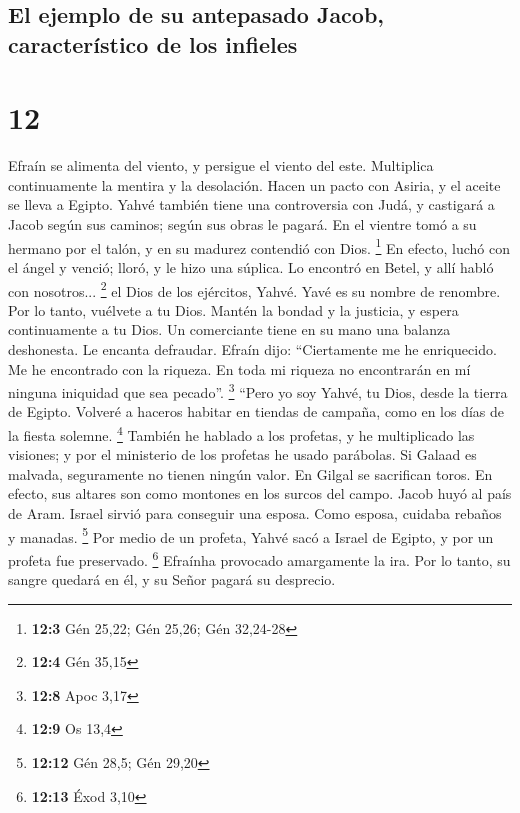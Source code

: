 \hypertarget{el-ejemplo-de-su-antepasado-jacob-caracteruxedstico-de-los-infieles}{%
\subsection{El ejemplo de su antepasado Jacob, característico de los
infieles}\label{el-ejemplo-de-su-antepasado-jacob-caracteruxedstico-de-los-infieles}}

\hypertarget{section-11}{%
\section{12}\label{section-11}}

 Efraín se alimenta del viento, y persigue el viento del
este. Multiplica continuamente la mentira y la desolación. Hacen un
pacto con Asiria, y el aceite se lleva a Egipto.  Yahvé
también tiene una controversia con Judá, y castigará a Jacob según sus
caminos; según sus obras le pagará.  En el vientre tomó a
su hermano por el talón, y en su madurez contendió con Dios. \footnote{\textbf{12:3}
  Gén 25,22; Gén 25,26; Gén 32,24-28}  En efecto, luchó
con el ángel y venció; lloró, y le hizo una súplica. Lo encontró en
Betel, y allí habló con nosotros... \footnote{\textbf{12:4} Gén 35,15}
 el Dios de los ejércitos, Yahvé. Yavé es su nombre de
renombre.  Por lo tanto, vuélvete a tu Dios. Mantén la
bondad y la justicia, y espera continuamente a tu Dios. 
Un comerciante tiene en su mano una balanza deshonesta. Le encanta
defraudar.  Efraín dijo: ``Ciertamente me he enriquecido.
Me he encontrado con la riqueza. En toda mi riqueza no encontrarán en mí
ninguna iniquidad que sea pecado''. \footnote{\textbf{12:8} Apoc 3,17}
 ``Pero yo soy Yahvé, tu Dios, desde la tierra de Egipto.
Volveré a haceros habitar en tiendas de campaña, como en los días de la
fiesta solemne. \footnote{\textbf{12:9} Os 13,4}  También
he hablado a los profetas, y he multiplicado las visiones; y por el
ministerio de los profetas he usado parábolas.  Si Galaad
es malvada, seguramente no tienen ningún valor. En Gilgal se sacrifican
toros. En efecto, sus altares son como montones en los surcos del campo.
 Jacob huyó al país de Aram. Israel sirvió para conseguir
una esposa. Como esposa, cuidaba rebaños y manadas. \footnote{\textbf{12:12}
  Gén 28,5; Gén 29,20}  Por medio de un profeta, Yahvé
sacó a Israel de Egipto, y por un profeta fue preservado. \footnote{\textbf{12:13}
  Éxod 3,10}  Efraínha provocado amargamente la ira. Por
lo tanto, su sangre quedará en él, y su Señor pagará su desprecio.

